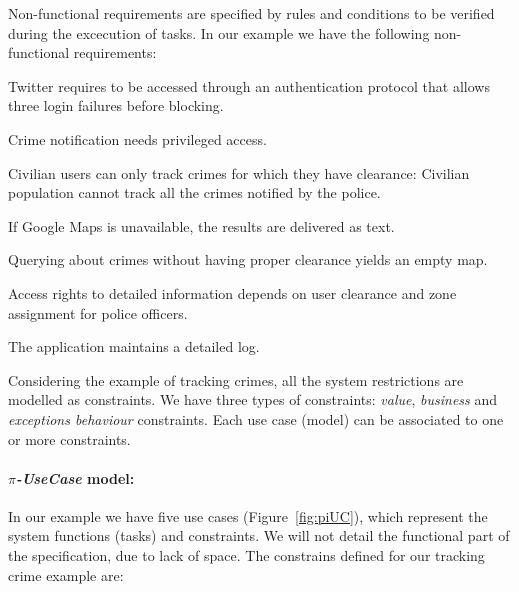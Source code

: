 Non-functional requirements are specified by rules and conditions to be verified during the excecution of tasks.
In our example we have the following non-functional requirements:
\begin{numtrivlist}
\item Twitter requires to be accessed through an authentication protocol that allows three login failures before blocking. 
\item Crime notification needs privileged access.
\item Civilian users can only track crimes for which they have clearance: Civilian population cannot track all the crimes notified by the police. 
\item If \textsf{Google Maps} is unavailable, the results are delivered as text. 
\item Querying about crimes without having proper clearance yields an empty map.
\item Access rights to detailed information depends on user clearance and zone assignment for police officers. 
\item The application maintains a detailed log. 
\end{numtrivlist}

Considering the example of tracking crimes, all the system restrictions are
modelled as constraints. 
We have three types of constraints:
\textit{value}, \textit{business} and \textit{exceptions behaviour} constraints.
Each use case (model) can be associated to one or more constraints.

\paragraph*{\textit{$\pi$-UseCase} model:} 
In our example we have five use cases (Figure~\ref{fig:piUC}), which represent the
system functions (tasks) and constraints. 
We will not detail the functional part of the specification, due to lack of space.
The constrains defined for our tracking crime example are: 

